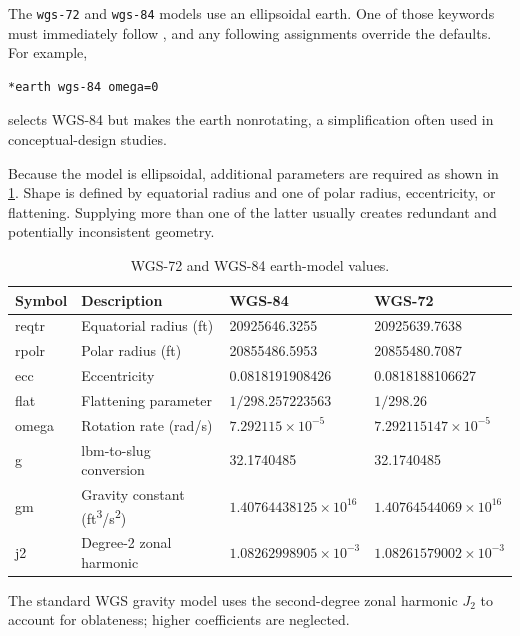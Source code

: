
The \texttt{wgs-72} and \texttt{wgs-84} models use an ellipsoidal earth. One of
those keywords must immediately follow , and any following
assignments override the defaults. For example,

\begin{lstlisting}[style=taosmanual]
*earth wgs-84 omega=0
\end{lstlisting}

selects WGS-84 but makes the earth nonrotating, a simplification often used in
conceptual-design studies.

Because the model is ellipsoidal, additional parameters are required as shown in
\cref{tab:wgs-earth-model-values}. Shape is defined by equatorial radius and one
of polar radius, eccentricity, or flattening. Supplying more than one of the latter
usually creates redundant and potentially inconsistent geometry.

\begin{table}[htbp]
  \centering
  \caption{WGS-72 and WGS-84 earth-model values.}
  \label{tab:wgs-earth-model-values}
  \small
  \begin{tabularx}{0.98\linewidth}{@{}>{\ttfamily}lXll@{}}
    \toprule
    \normalfont Symbol & Description & WGS-84 & WGS-72 \\
    \midrule
    reqtr & Equatorial radius (ft) & 20925646.3255 & 20925639.7638 \\
    rpolr & Polar radius (ft) & 20855486.5953 & 20855480.7087 \\
    ecc & Eccentricity & 0.0818191908426 & 0.0818188106627 \\
    flat & Flattening parameter & $1/298.257223563$ & $1/298.26$ \\
    omega & Rotation rate (rad/s) & $7.292115\times10^{-5}$ & $7.292115147\times10^{-5}$ \\
    g & lbm-to-slug conversion & 32.1740485 & 32.1740485 \\
    gm & Gravity constant (ft\textsuperscript{3}/s\textsuperscript{2}) & $1.40764438125\times10^{16}$ & $1.40764544069\times10^{16}$ \\
    j2 & Degree-2 zonal harmonic & $1.08262998905\times10^{-3}$ & $1.08261579002\times10^{-3}$ \\
    \bottomrule
  \end{tabularx}
\end{table}

The standard WGS gravity model uses the second-degree zonal harmonic $J_2$ to
account for oblateness; higher coefficients are neglected.

